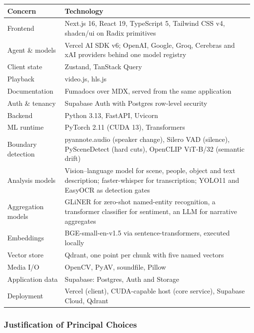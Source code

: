 \begin{table}[htbp]
\centering
\small
\begin{tabularx}{\textwidth}{@{}L{3.2cm}X@{}}
\toprule
\textbf{Concern} & \textbf{Technology} \\
\midrule
Frontend        & Next.js 16, React 19, TypeScript 5, Tailwind CSS v4, shadcn/ui on Radix primitives \\
Agent \& models & Vercel AI SDK v6; OpenAI, Google, Groq, Cerebras and xAI providers behind one model registry \\
Client state    & Zustand, TanStack Query \\
Playback        & video.js, hls.js \\
Documentation   & Fumadocs over MDX, served from the same application \\
Auth \& tenancy & Supabase Auth with Postgres row-level security \\
Backend         & Python 3.13, FastAPI, Uvicorn \\
ML runtime      & PyTorch 2.11 (CUDA 13), Transformers \\
Boundary detection & pyannote.audio (speaker change), Silero VAD (silence), PySceneDetect (hard cuts), OpenCLIP ViT-B/32 (semantic drift) \\
Analysis models & Vision--language model for scene, people, object and text description; faster-whisper for transcription; YOLO11 and EasyOCR as detection gates \\
Aggregation models & GLiNER for zero-shot named-entity recognition, a transformer classifier for sentiment, an LLM for narrative aggregates \\
Embeddings      & BGE-small-en-v1.5 via sentence-transformers, executed locally \\
Vector store    & Qdrant, one point per chunk with five named vectors \\
Media I/O       & OpenCV, PyAV, soundfile, Pillow \\
Application data & Supabase: Postgres, Auth and Storage \\
Deployment      & Vercel (client), CUDA-capable host (core service), Supabase Cloud, Qdrant \\
\bottomrule
\end{tabularx}
\end{table}


\subsubsection*{Justification of Principal Choices}


